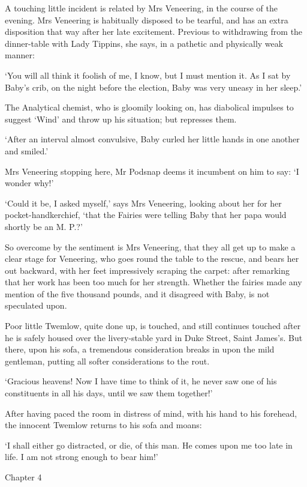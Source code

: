 A touching little incident is related by Mrs Veneering, in the course of
the evening. Mrs Veneering is habitually disposed to be tearful, and
has an extra disposition that way after her late excitement. Previous
to withdrawing from the dinner-table with Lady Tippins, she says, in a
pathetic and physically weak manner:

‘You will all think it foolish of me, I know, but I must mention it. As
I sat by Baby’s crib, on the night before the election, Baby was very
uneasy in her sleep.’

The Analytical chemist, who is gloomily looking on, has diabolical
impulses to suggest ‘Wind’ and throw up his situation; but represses
them.

‘After an interval almost convulsive, Baby curled her little hands in
one another and smiled.’

Mrs Veneering stopping here, Mr Podsnap deems it incumbent on him to
say: ‘I wonder why!’

‘Could it be, I asked myself,’ says Mrs Veneering, looking about her for
her pocket-handkerchief, ‘that the Fairies were telling Baby that her
papa would shortly be an M. P.?’

So overcome by the sentiment is Mrs Veneering, that they all get up
to make a clear stage for Veneering, who goes round the table to the
rescue, and bears her out backward, with her feet impressively scraping
the carpet: after remarking that her work has been too much for her
strength. Whether the fairies made any mention of the five thousand
pounds, and it disagreed with Baby, is not speculated upon.

Poor little Twemlow, quite done up, is touched, and still continues
touched after he is safely housed over the livery-stable yard in
Duke Street, Saint James’s. But there, upon his sofa, a tremendous
consideration breaks in upon the mild gentleman, putting all softer
considerations to the rout.

‘Gracious heavens! Now I have time to think of it, he never saw one of
his constituents in all his days, until we saw them together!’

After having paced the room in distress of mind, with his hand to his
forehead, the innocent Twemlow returns to his sofa and moans:

‘I shall either go distracted, or die, of this man. He comes upon me too
late in life. I am not strong enough to bear him!’



Chapter 4

